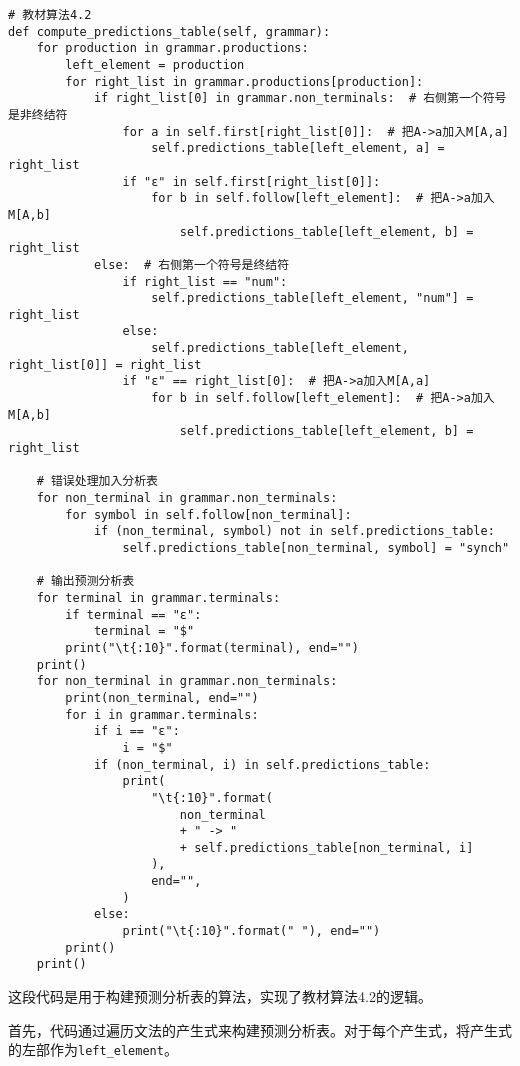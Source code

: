 \documentclass[lang=cn,11pt,a4paper]{elegantpaper}
\begin{document}
\begin{lstlisting}
# 教材算法4.2
def compute_predictions_table(self, grammar):
    for production in grammar.productions:
        left_element = production
        for right_list in grammar.productions[production]:
            if right_list[0] in grammar.non_terminals:  # 右侧第一个符号是非终结符
                for a in self.first[right_list[0]]:  # 把A->a加入M[A,a]
                    self.predictions_table[left_element, a] = right_list
                if "ε" in self.first[right_list[0]]:
                    for b in self.follow[left_element]:  # 把A->a加入M[A,b]
                        self.predictions_table[left_element, b] = right_list
            else:  # 右侧第一个符号是终结符
                if right_list == "num":
                    self.predictions_table[left_element, "num"] = right_list
                else:
                    self.predictions_table[left_element, right_list[0]] = right_list
                if "ε" == right_list[0]:  # 把A->a加入M[A,a]
                    for b in self.follow[left_element]:  # 把A->a加入M[A,b]
                        self.predictions_table[left_element, b] = right_list

    # 错误处理加入分析表
    for non_terminal in grammar.non_terminals:
        for symbol in self.follow[non_terminal]:
            if (non_terminal, symbol) not in self.predictions_table:
                self.predictions_table[non_terminal, symbol] = "synch"

    # 输出预测分析表
    for terminal in grammar.terminals:
        if terminal == "ε":
            terminal = "$"
        print("\t{:10}".format(terminal), end="")
    print()
    for non_terminal in grammar.non_terminals:
        print(non_terminal, end="")
        for i in grammar.terminals:
            if i == "ε":
                i = "$"
            if (non_terminal, i) in self.predictions_table:
                print(
                    "\t{:10}".format(
                        non_terminal
                        + " -> "
                        + self.predictions_table[non_terminal, i]
                    ),
                    end="",
                )
            else:
                print("\t{:10}".format(" "), end="")
        print()
    print()
\end{lstlisting}

这段代码是用于构建预测分析表的算法，实现了教材算法4.2的逻辑。

首先，代码通过遍历文法的产生式来构建预测分析表。对于每个产生式，将产生式的左部作为\lstinline{left_element}。
\end{document}
